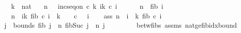 \begin{isabellebody}
\ \ \ k\ {\isacharcolon}{\kern0pt}{\isacharcolon}{\kern0pt}\ nat\isanewline
\ \ \ {\isachardoublequoteopen}n\ {\isasymge}\ {}{\isachardoublequoteclose}\ {\isachardoublequoteopen}inc{\isacharunderscore}{\kern0pt}seq{\isacharunderscore}{\kern0pt}on\ c\ {\isacharbraceleft}{\kern0pt}{}{\isachardot}{\kern0pt}{\isachardot}{\kern0pt}k{\isacharminus}{\kern0pt}{}{\isacharbraceright}{\kern0pt}{\isachardoublequoteclose}\ {\isachardoublequoteopen}{\isasymforall}i{\isasymin}{\isacharbraceleft}{\kern0pt}{}{\isachardot}{\kern0pt}{\isachardot}{\kern0pt}k{\isacharbraceright}{\kern0pt}{\isachardot}{\kern0pt}\ c\ i\ {\isasymge}\ {}{\isachardoublequoteclose}\ \isanewline
\ \ \ {\isachardoublequoteopen}n\ {\isacharequal}{\kern0pt}\ fib\ i{\isachardoublequoteclose}\isanewline
\ \ \ {\isachardoublequoteopen}n\ {\isacharequal}{\kern0pt}\ {\isacharparenleft}{\kern0pt}{\isasymSum}i{\isacharequal}{\kern0pt}{}{\isachardot}{\kern0pt}{\isachardot}{\kern0pt}k{\isachardot}{\kern0pt}\ fib\ {\isacharparenleft}{\kern0pt}c\ i{\isacharparenright}{\kern0pt}{\isacharparenright}{\kern0pt}\ {\isasymlongleftrightarrow}\ k\ {\isacharequal}{\kern0pt}\ {}\ {\isasymand}\ c\ {}\ {\isacharequal}{\kern0pt}\ i{\isachardoublequoteclose}\isanewline
%
\isadelimproof
%
\endisadelimproof
%
\isatagproof
{}\isamarkupfalse%
\isanewline
\ \ \isamarkupfalse%
\ ass{\isacharcolon}{\kern0pt}\ {\isachardoublequoteopen}n\ {\isacharequal}{\kern0pt}\ {\isacharparenleft}{\kern0pt}{\isasymSum}i\ {\isacharequal}{\kern0pt}\ {}{\isachardot}{\kern0pt}{\isachardot}{\kern0pt}k{\isachardot}{\kern0pt}\ fib\ {\isacharparenleft}{\kern0pt}c\ i{\isacharparenright}{\kern0pt}{\isacharparenright}{\kern0pt}{\isachardoublequoteclose}\isanewline
\ \ \isamarkupfalse%
\ j\ \ bounds{\isacharcolon}{\kern0pt}\ {\isachardoublequoteopen}fib\ j\ {\isasymle}\ n{\isachardoublequoteclose}\ {\isachardoublequoteopen}fib{\isacharparenleft}{\kern0pt}Suc\ j{\isacharparenright}{\kern0pt}\ {\isachargreater}{\kern0pt}\ n{\isachardoublequoteclose}\ {\isachardoublequoteopen}j\ {\isasymge}\ {}{\isachardoublequoteclose}\ \isanewline
\ \ \ \ \isamarkupfalse%
\ betw{\isacharunderscore}{\kern0pt}fibs\ assms\ nat{\isacharunderscore}{\kern0pt}ge{\isacharunderscore}{\kern0pt}{}{\isacharunderscore}{\kern0pt}fib{\isacharunderscore}{\kern0pt}idx{\isacharunderscore}{\kern0pt}bound\ \isamarkupfalse%

\end{isabellebody}
